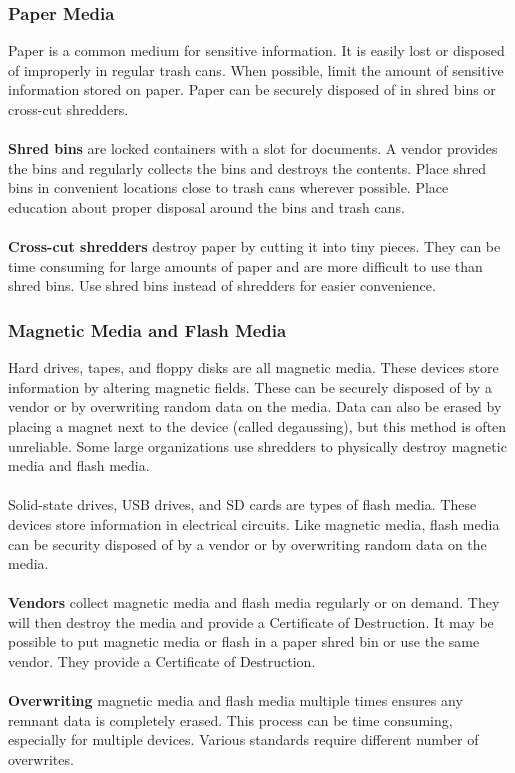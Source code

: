 \subsubsection{Paper Media}
Paper is a common medium for sensitive information. It is easily lost or disposed of improperly in regular trash cans. When possible, limit the amount of sensitive information stored on paper. Paper can be securely disposed of in shred bins or cross-cut shredders.\\\\
\textbf{Shred bins} are locked containers with a slot for documents. A vendor provides the bins and regularly collects the bins and destroys the contents. Place shred bins in convenient locations close to trash cans wherever possible. Place education about proper disposal around the bins and trash cans.\\\\
\textbf{Cross-cut shredders} destroy paper by cutting it into tiny pieces. They can be time consuming for large amounts of paper and are more difficult to use than shred bins. Use shred bins instead of shredders for easier convenience.
\subsubsection{Magnetic Media and Flash Media}
Hard drives, tapes, and floppy disks are all magnetic media. These devices store information by altering magnetic fields. These can be securely disposed of by a vendor or by overwriting random data on the media. Data can also be erased by placing a magnet next to the device (called degaussing), but this method is often unreliable. Some large organizations use shredders to physically destroy magnetic media and flash media.\\\\
Solid-state drives, USB drives, and SD cards are types of flash media. These devices store information in electrical circuits. Like magnetic media, flash media can be security disposed of by a vendor or by overwriting random data on the media.\\\\
\textbf{Vendors} collect magnetic media and flash media regularly or on demand. They will then destroy the media and provide a Certificate of Destruction. It may be possible to put magnetic media or flash in a paper shred bin or use the same vendor. They provide a Certificate of Destruction.\\\\
\textbf{Overwriting} magnetic media and flash media multiple times ensures any remnant data is completely erased. This process can be time consuming, especially for multiple devices. Various standards require different number of overwrites.

